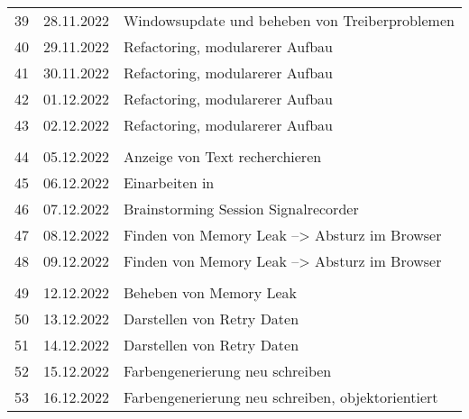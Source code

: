 \begin{longtable}{|l|c|l|}
&               &                                                       \\ \hline   
39  & 28.11.2022    &  Windowsupdate und beheben von Treiberproblemen                                                    \\ \hline   
40  & 29.11.2022    &  Refactoring, modularerer Aufbau                                                     \\ \hline   
41  & 30.11.2022    &  Refactoring, modularerer Aufbau                                                     \\ \hline   
42  & 01.12.2022    &  Refactoring, modularerer Aufbau                                                     \\ \hline   
43  & 02.12.2022    &  Refactoring, modularerer Aufbau                                                     \\ \hline  
&               &                                                       \\ \hline  
44  & 05.12.2022    &  Anzeige von Text recherchieren                                                     \\ \hline   
45  & 06.12.2022    &  Einarbeiten in \q{SDL-ttf}                                                 \\ \hline   
46  & 07.12.2022    &  Brainstorming Session Signalrecorder                 \\ \hline 
47  & 08.12.2022    &  Finden von Memory Leak --> Absturz im Browser                                                     \\ \hline 
48  & 09.12.2022    &  Finden von Memory Leak --> Absturz im Browser                                                       \\ \hline 
&               &                                                       \\ \hline 
49  & 12.12.2022    &  Beheben von Memory Leak                                                     \\ \hline 
50  & 13.12.2022    &  Darstellen von Retry Daten                                                     \\ \hline 
51  & 14.12.2022    &  Darstellen von Retry Daten                                                      \\ \hline 
52  & 15.12.2022    &  Farbengenerierung neu schreiben                                                     \\ \hline 
53  & 16.12.2022    &  Farbengenerierung neu schreiben, objektorientiert                                                     \\ \hline 

\end{longtable}
